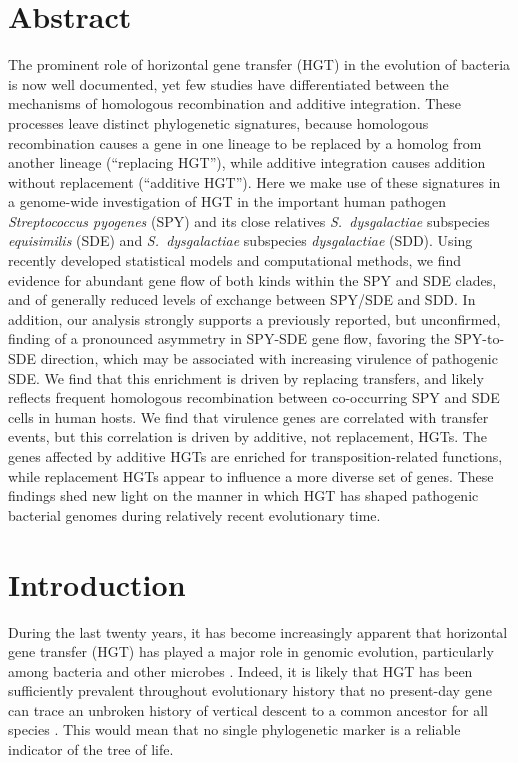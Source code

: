 \documentclass[12pt]{article}
\begin{document}
\doublespacing

\section*{Abstract}

The prominent role of horizontal gene transfer (HGT) in the evolution of
bacteria is now well documented, yet few studies have differentiated
between the mechanisms of homologous recombination and additive integration.
These processes leave distinct phylogenetic signatures, because homologous
recombination causes a gene in one lineage to be replaced by a homolog from
another lineage (``replacing HGT''), while additive integration causes
addition without replacement (``additive HGT'').  Here we make use of these
signatures in a genome-wide investigation of HGT in the important human
pathogen {\em Streptococcus pyogenes} (SPY) and its close relatives {\em
  S.\ dysgalactiae} subspecies {\em equisimilis} (SDE) and {\em S.\
  dysgalactiae} subspecies {\em dysgalactiae} (SDD).  Using recently
developed statistical models and computational methods, we find evidence
for abundant gene flow of both kinds within the SPY and SDE clades, and of
generally reduced levels of exchange between SPY/SDE and SDD.  In addition,
our analysis strongly supports a previously reported, but unconfirmed,
finding of a pronounced asymmetry in SPY-SDE gene flow, favoring the
SPY-to-SDE direction, which may be associated with increasing virulence of
pathogenic SDE.  We find that this enrichment is driven by replacing
transfers, and likely reflects frequent homologous recombination between
co-occurring SPY and SDE cells in human hosts.  We find that virulence
genes are correlated with transfer events, but this correlation is driven
by additive, not replacement, HGTs.  The genes affected by additive HGTs
are enriched for transposition-related functions, while replacement HGTs
appear to influence a more diverse set of genes.  These findings shed new
light on the manner in which HGT has shaped pathogenic bacterial genomes
during relatively recent evolutionary time.

\thispagestyle{empty}
\clearpage

\section*{Introduction}

During the last twenty years, it has become increasingly apparent that
horizontal gene transfer (HGT) has played a major role in genomic
evolution, particularly among bacteria and other microbes
\citep{Smith1992,Smith1993,Ochman2000,Koonin2001}.  Indeed, it is likely
that HGT has been sufficiently prevalent throughout evolutionary history
that no present-day gene can trace an unbroken history of vertical descent
to a common ancestor for all species \citep{Zhaxybayeva2011}.  This would
mean that no single phylogenetic marker is a reliable indicator of the tree
of life.
\end{document}
